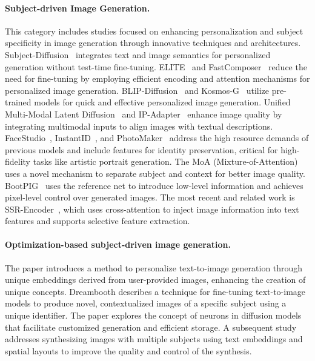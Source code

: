 \paragraph{Subject-driven Image Generation.} 
This category includes studies focused on enhancing personalization and subject specificity in image generation through innovative techniques and architectures. Subject-Diffusion~\cite{ma2023subject} integrates text and image semantics for personalized generation without test-time fine-tuning. ELITE~\cite{wei2023elite} and FastComposer~\cite{xiao2023fastcomposer} reduce the need for fine-tuning by employing efficient encoding and attention mechanisms for personalized image generation.
BLIP-Diffusion~\cite{li2024blip} and Kosmos-G~\cite{pan2023kosmos} utilize pre-trained models for quick and effective personalized image generation. Unified Multi-Modal Latent Diffusion~\cite{ma2023unified} and IP-Adapter~\cite{ye2023ip} enhance image quality by integrating multimodal inputs to align images with textual descriptions. FaceStudio~\cite{yan2023facestudio}, InstantID~\cite{wang2024instantid}, and PhotoMaker~\cite{li2023photomaker} address the high resource demands of previous models and include features for identity preservation, critical for high-fidelity tasks like artistic portrait generation. 
The MoA (Mixture-of-Attention)~\cite{ostashev2024moa} uses a novel mechanism to separate subject and context for better image quality. 
BootPIG~\cite{purushwalkam2024bootpig} uses the reference net to introduce low-level information and achieves pixel-level control over generated images. 
The most recent and related work is SSR-Encoder~\cite{zhang2023ssr}, which uses cross-attention to inject image information into text features and supports selective feature extraction.

\paragraph{Optimization-based subject-driven image generation.} The paper \cite{gal2022image} introduces a method to personalize text-to-image generation through unique embeddings derived from user-provided images, enhancing the creation of unique concepts. Dreambooth \cite{ruiz2023dreambooth} describes a technique for fine-tuning text-to-image models to produce novel, contextualized images of a specific subject using a unique identifier. The paper \cite{liu2023cones} explores the concept of neurons in diffusion models that facilitate customized generation and efficient storage. A subsequent study \cite{liu2023cones} addresses synthesizing images with multiple subjects using text embeddings and spatial layouts to improve the quality and control of the synthesis.